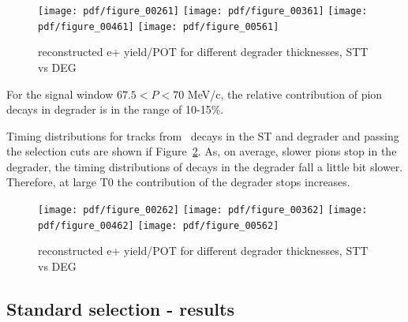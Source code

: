 
\begin{figure}[H]
  \texttt{[image: pdf/figure\_00261]}
  \texttt{[image: pdf/figure\_00361]}
  \texttt{[image: pdf/figure\_00461]}
  \texttt{[image: pdf/figure\_00561]}
  \caption{
    \label{fig:stt_vs_deg_momentum_good_tracks}
    reconstructed e+ yield/POT for different degrader thicknesses, STT vs DEG
  }
\end{figure}

For the signal window $67.5 < P < 70$ MeV/c, the relative contribution of pion
decays in degrader is in the range of 10-15\%.

Timing distributions for tracks from \piplusenu\ decays in the ST and degrader and
passing the selection cuts are shown if Figure~\ref{figure:stt_vs_deg_t0_good_tracks}.
As, on average, slower pions stop in the degrader, the timing distributions 
of decays in the degrader fall a little bit slower.
Therefore, at large T0 the contribution of the degrader stops increases.


\begin{figure}[H]
  \texttt{[image: pdf/figure\_00262]}
  \texttt{[image: pdf/figure\_00362]}
  \texttt{[image: pdf/figure\_00462]}
  \texttt{[image: pdf/figure\_00562]}
  \caption{
    \label{figure:stt_vs_deg_t0_good_tracks}
    reconstructed e+ yield/POT for different degrader thicknesses, STT vs DEG
  }
\end{figure}

\subsection{Standard selection - results}


